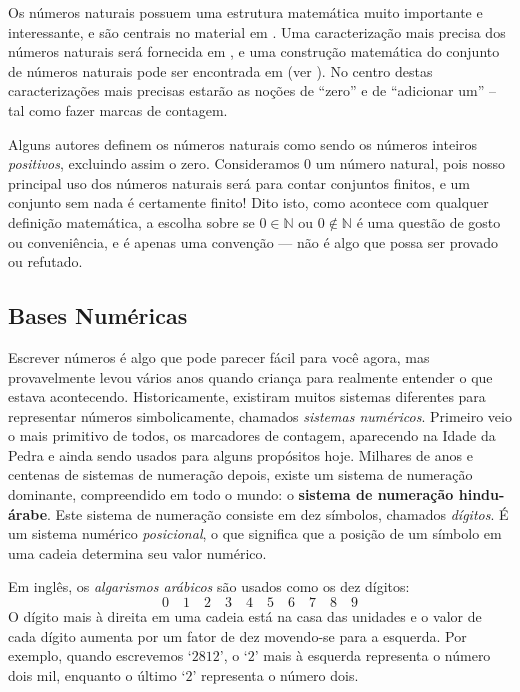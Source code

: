 Os números naturais possuem uma estrutura matemática muito importante e interessante, e são centrais no material em . Uma caracterização mais precisa dos números naturais será fornecida em , e uma construção matemática do conjunto de números naturais pode ser encontrada em  (ver ). No centro destas caracterizações mais precisas estarão as noções de “zero” e de “adicionar um” – tal como fazer marcas de contagem.

\begin{Nota}
Alguns autores definem os números naturais como sendo os números inteiros \textit{positivos}, excluindo assim o zero. Consideramos $0$ um número natural, pois nosso principal uso dos números naturais será para contar conjuntos finitos, e um conjunto sem nada é certamente finito! Dito isto, como acontece com qualquer definição matemática, a escolha sobre se $0 \in \mathbb{N}$ ou $0 \not \in \mathbb{N}$ é uma questão de gosto ou conveniência, e é apenas uma convenção --- não é algo que possa ser provado ou refutado.
\end{Nota}

\subsection*{Bases Numéricas}

Escrever números é algo que pode parecer fácil para você agora, mas provavelmente levou vários anos quando criança para realmente entender o que estava acontecendo. Historicamente, existiram muitos sistemas diferentes para representar números simbolicamente, chamados \textit{sistemas numéricos}. Primeiro veio o mais primitivo de todos, os marcadores de contagem, aparecendo na Idade da Pedra e ainda sendo usados para alguns propósitos hoje. Milhares de anos e centenas de sistemas de numeração depois, existe um sistema de numeração dominante, compreendido em todo o mundo: o \textbf{sistema de numeração hindu-árabe}. Este sistema de numeração consiste em dez símbolos, chamados \textit{dígitos}. É um sistema numérico \textit{posicional}, o que significa que a posição de um símbolo em uma cadeia determina seu valor numérico.

Em inglês, os \textit{algarismos arábicos} são usados como os dez dígitos:
\[0 \quad 1 \quad 2 \quad 3 \quad 4 \quad 5 \quad 6 \quad 7 \quad 8 \quad 9 \]
O dígito mais à direita em uma cadeia está na casa das unidades e o valor de cada dígito aumenta por um fator de dez movendo-se para a esquerda. Por exemplo, quando escrevemos `$2812$', o `$2$' mais à esquerda representa o número dois mil, enquanto o último `$2$' representa o número dois.

